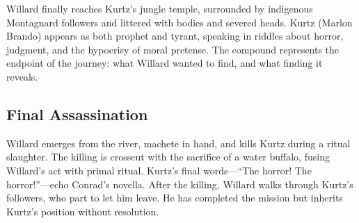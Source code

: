 Willard finally reaches Kurtz's jungle temple, surrounded by indigenous Montagnard followers
and littered with bodies and severed heads. Kurtz (Marlon Brando) appears as both prophet and
tyrant, speaking in riddles about horror, judgment, and the hypocrisy of moral pretense. The
compound represents the endpoint of the journey: what Willard wanted to find, and what finding
it reveals.

\subsection*{Final Assassination}
\label{scene:assassination}

Willard emerges from the river, machete in hand, and kills Kurtz during a ritual slaughter.
The killing is crosscut with the sacrifice of a water buffalo, fusing Willard's act with
primal ritual. Kurtz's final words---``The horror! The horror!''---echo Conrad's novella.
After the killing, Willard walks through Kurtz's followers, who part to let him leave. He has
completed the mission but inherits Kurtz's position without resolution.
